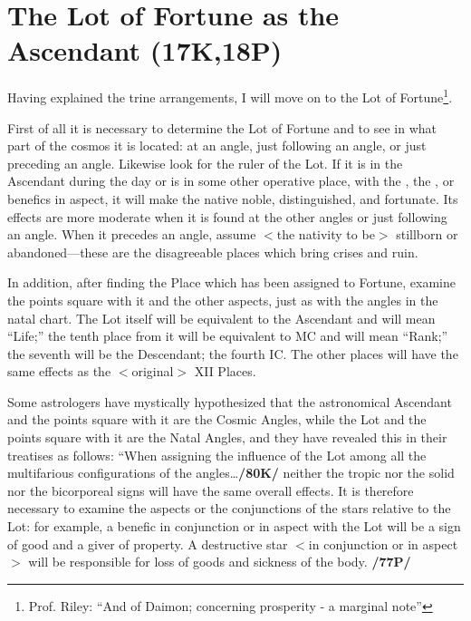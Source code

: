 \section{The Lot of Fortune as the Ascendant (17K,18P)}

Having explained the trine arrangements, I will move on to the Lot of Fortune\footnote{Prof. Riley: ``And of Daimon; concerning prosperity - a marginal note''}. 

First of all it is necessary to determine the Lot of Fortune and to see in what part of the cosmos it is located: at an angle, just following an angle, or just preceding an angle. Likewise look for the ruler of the Lot. If it is in the Ascendant during the day or is in some other operative place, with the \Sun, the \Moon, or benefics in aspect, it will make the native noble, distinguished, and fortunate. Its effects are more moderate when it is found at the other angles or just following an angle. \mndl When it precedes an angle, assume $<$the nativity to be$>$ stillborn or abandoned—these are the disagreeable places which bring crises and ruin.

In addition, after finding the Place which has been assigned to Fortune, examine the points square with it and the other aspects, just as with the angles in the natal chart. The Lot itself will be equivalent to the Ascendant and will mean “Life;” the tenth place from it will be equivalent to MC and will mean “Rank;” the seventh will be the Descendant; the fourth IC. The other places will have the same effects as the
$<$original$>$ XII Places. 

Some astrologers have mystically hypothesized that the astronomical Ascendant and the points square with it are the Cosmic Angles, while the Lot and the points square with it are the Natal Angles, and they have revealed this in their treatises as follows: “When assigning the influence of the
Lot among all the multifarious configurations of the angles\ldots \textbf{/80K/} neither the tropic nor the solid nor the bicorporeal signs will have the same overall effects. It is therefore necessary to examine the aspects or the
conjunctions of the stars relative to the Lot: for example, a benefic in conjunction or in aspect with the Lot will be a sign of good and a giver of property. A destructive star $<$in conjunction or in aspect$>$ will be responsible for loss of goods and sickness of the body. \textbf{/77P/}

\newpage
